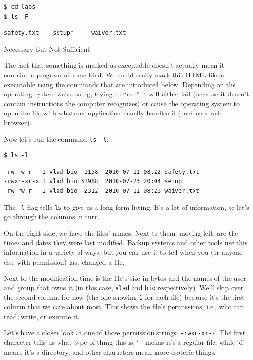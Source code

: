 \documentclass{book}
\begin{document}
\begin{verbatim}
$ cd labs
$ ls -F
\end{verbatim}

\begin{verbatim}
safety.txt    setup*     waiver.txt
\end{verbatim}

\begin{swcbox}{Necessary But Not Sufficient}

The fact that something is marked as executable doesn't actually mean it
contains a program of some kind. We could easily mark this HTML file as
executable using the commands that are introduced below. Depending on
the operating system we're using, trying to ``run'' it will either fail
(because it doesn't contain instructions the computer recognizes) or
cause the operating system to open the file with whatever application
usually handles it (such as a web browser).

\end{swcbox}

Now let's run the command \texttt{ls -l}:

\begin{verbatim}
$ ls -l
\end{verbatim}

\begin{verbatim}
-rw-rw-r-- 1 vlad bio  1158  2010-07-11 08:22 safety.txt
-rwxr-xr-x 1 vlad bio 31988  2010-07-23 20:04 setup
-rw-rw-r-- 1 vlad bio  2312  2010-07-11 08:23 waiver.txt
\end{verbatim}

The \texttt{-l} flag tells \texttt{ls} to give us a long-form listing.
It's a lot of information, so let's go through the columns in turn.

On the right side, we have the files' names. Next to them, moving left,
are the times and dates they were last modified. Backup systems and
other tools use this information in a variety of ways, but you can use
it to tell when you (or anyone else with permission) last changed a
file.

Next to the modification time is the file's size in bytes and the names
of the user and group that owns it (in this case, \texttt{vlad} and
\texttt{bio} respectively). We'll skip over the second column for now
(the one showing \texttt{1} for each file) because it's the first column
that we care about most. This shows the file's permissions, i.e., who
can read, write, or execute it.

Let's have a closer look at one of those permission strings:
\texttt{-rwxr-xr-x}. The first character tells us what type of thing
this is: `-' means it's a regular file, while `d' means it's a
directory, and other characters mean more esoteric things.
\end{document}
